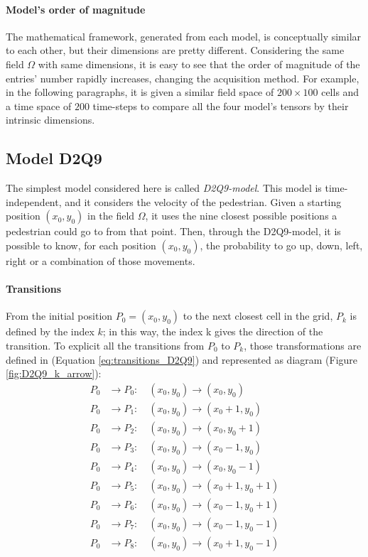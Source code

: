 \documentclass[class=article, crop=false]{standalone}
\begin{document}
\paragraph{Model's order of magnitude}
The mathematical framework, generated from each model, is conceptually similar to each other, but their dimensions are pretty different. 
Considering the same field $\Omega$ with same dimensions, it is easy to see that the order of magnitude of the entries’ number rapidly increases, changing the acquisition method.
For example, in the following paragraphs, it is given a similar field space of $200\times100$ cells and a time space of $200$ time-steps to compare all the four model’s tensors by their intrinsic dimensions.


\FloatBarrier
\subsection{Model D2Q9} \label{chap:Model_D2Q9}

The simplest model considered here is called \emph{D2Q9-model}. 
This model is time-independent, and it considers the velocity of the pedestrian. 
Given a starting position $(x_0, y_0)$ in the field $\Omega$, it uses the nine closest possible positions a pedestrian could go to from that point. 
Then, through the D2Q9-model, it is possible to know, for each position $(x_0, y_0)$, the probability to go up, down, left, right or a combination of those movements.



\paragraph{Transitions} 

From the initial position $P_0=(x_0, y_0)$ to the next closest cell in the grid, $P_k$ is defined by the index $k$; in this way, the index k gives the direction of the transition. 
To explicit all the transitions from $P_0$ to $P_k$, those transformations are defined in (Equation \ref{eq:transitions_D2Q9}) and represented as diagram (Figure \ref{fig:D2Q9_k_arrow}):
\begin{equation}
\begin{split}
P_0 &\to P_0 : \quad (x_0, y_0) \to (x_0, y_0) \\
P_0 &\to P_1 : \quad (x_0, y_0) \to (x_0+1, y_0) \\
P_0 &\to P_2 : \quad (x_0, y_0) \to (x_0, y_0+1) \\
P_0 &\to P_3 : \quad (x_0, y_0) \to (x_0-1, y_0) \\
P_0 &\to P_4 : \quad (x_0, y_0) \to (x_0, y_0-1) \\
P_0 &\to P_5 : \quad (x_0, y_0) \to (x_0+1, y_0+1) \\
P_0 &\to P_6 : \quad (x_0, y_0) \to (x_0-1, y_0+1) \\
P_0 &\to P_7 : \quad (x_0, y_0) \to (x_0-1, y_0-1) \\
P_0 &\to P_8 : \quad (x_0, y_0) \to (x_0+1, y_0-1) \\
\end{split}
\label{eq:transitions_D2Q9}
\end{equation}
\end{document}
